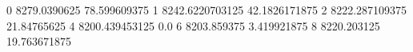 0 8279.0390625 78.599609375
1 8242.6220703125 42.1826171875
2 8222.287109375 21.84765625
4 8200.439453125 0.0
6 8203.859375 3.419921875
8 8220.203125 19.763671875
